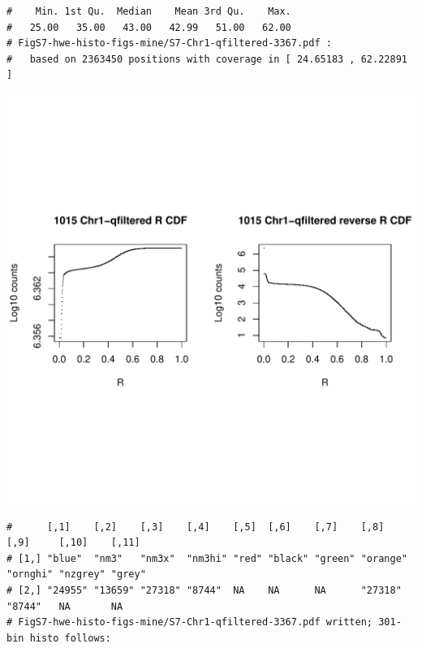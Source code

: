\documentclass{article}\usepackage[]{graphicx}\usepackage[]{color}
\makeatletter
\def\maxwidth{ %
  \ifdim\Gin@nat@width>\linewidth
    \linewidth
  \else
    \Gin@nat@width
  \fi
}
\newenvironment{kframe}{%
 \def\at@end@of@kframe{}%
 \ifinner\ifhmode%
  \def\at@end@of@kframe{\end{minipage}}%
  \begin{minipage}{\columnwidth}%
 \fi\fi%
 \def\FrameCommand##1{\hskip\@totalleftmargin \hskip-\fboxsep
 \colorbox{shadecolor}{##1}\hskip-\fboxsep
     \hskip-\linewidth \hskip-\@totalleftmargin \hskip\columnwidth}%
 \MakeFramed {\advance\hsize-\width
   \@totalleftmargin\z@ \linewidth\hsize
   \@setminipage}}%
 {\par\unskip\endMakeFramed%
 \at@end@of@kframe}
\newenvironment{knitrout}{}{} %
\makeatother
\begin{document}
\begin{knitrout}
\begin{kframe}
\begin{verbatim}
#    Min. 1st Qu.  Median    Mean 3rd Qu.    Max. 
#   25.00   35.00   43.00   42.99   51.00   62.00 
# FigS7-hwe-histo-figs-mine/S7-Chr1-qfiltered-3367.pdf :
#   based on 2363450 positions with coverage in [ 24.65183 , 62.22891 ]
\end{verbatim}
\end{kframe}
\includegraphics[width=\maxwidth]{FigS7-hwe-histo-figs-knitr/unnamed-chunk-10-52} 
\begin{kframe}\begin{verbatim}
#      [,1]    [,2]    [,3]    [,4]    [,5]  [,6]    [,7]    [,8]     [,9]     [,10]    [,11] 
# [1,] "blue"  "nm3"   "nm3x"  "nm3hi" "red" "black" "green" "orange" "ornghi" "nzgrey" "grey"
# [2,] "24955" "13659" "27318" "8744"  NA    NA      NA      "27318"  "8744"   NA       NA    
# FigS7-hwe-histo-figs-mine/S7-Chr1-qfiltered-3367.pdf written; 301-bin histo follows:
\end{verbatim}
\end{kframe}

\end{knitrout}
\end{document}
